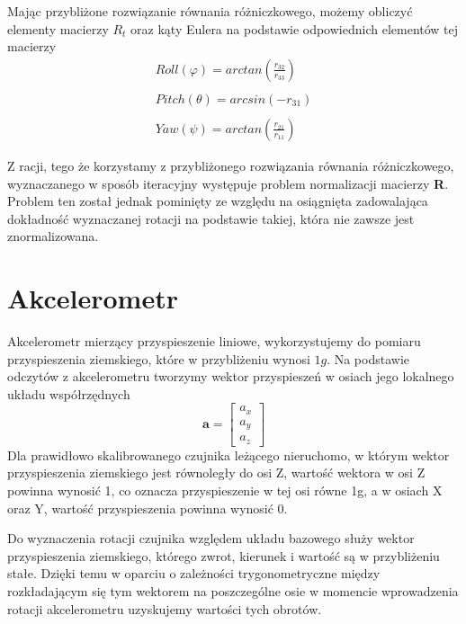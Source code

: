 Mając przybliżone rozwiązanie równania różniczkowego, możemy obliczyć elementy macierzy $R_t$ oraz kąty Eulera na podstawie odpowiednich elementów tej macierzy
\begin{equation}
    \begin{array}{c}
        Roll(\varphi) = arctan(\frac{r_{32}}{r_{33}}) \\ \\
        Pitch(\theta) = arcsin(-r_{31}) \\ \\
        Yaw(\psi) = arctan(\frac{r_{21}}{r_{11}})
    \end{array}
\end{equation}

Z racji, tego że korzystamy z przybliżonego rozwiązania równania różniczkowego, wyznaczanego w sposób iteracyjny występuje problem normalizacji macierzy \textbf{R}. Problem ten został jednak pominięty ze względu na osiągnięta zadowalająca dokładność wyznaczanej rotacji na podstawie takiej, która nie zawsze jest znormalizowana.

\section{Akcelerometr}

Akcelerometr mierzący przyspieszenie liniowe, wykorzystujemy do pomiaru przyspieszenia ziemskiego, które w przybliżeniu wynosi $1g$. Na podstawie odczytów z akcelerometru tworzymy wektor przyspieszeń w osiach jego lokalnego układu współrzędnych
$$
    \mathbf{a} = 
    \left[
    \begin{array}{cc}
        a_x \\
        a_y \\
        a_z
    \end{array}
    \right]
$$
Dla prawidłowo skalibrowanego czujnika leżącego nieruchomo, w którym wektor przyspieszenia ziemskiego jest równoległy do osi Z, wartość wektora w osi Z powinna wynosić 1, co oznacza przyspieszenie w tej osi równe 1g, a w osiach X oraz Y, wartość przyspieszenia powinna wynosić 0.

Do wyznaczenia rotacji czujnika względem układu bazowego służy wektor przyspieszenia ziemskiego, którego zwrot, kierunek i wartość są w przybliżeniu stałe. Dzięki temu w oparciu o zależności trygonometryczne między rozkładającym się tym wektorem na poszczególne osie w momencie wprowadzenia rotacji akcelerometru uzyskujemy wartości tych obrotów.

